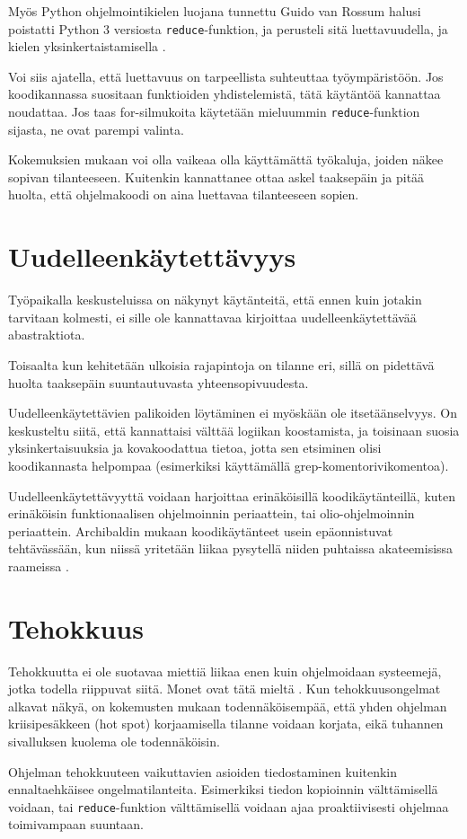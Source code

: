 Myös Python ohjelmointikielen luojana tunnettu Guido van Rossum halusi poistatti Python 3 versiosta \texttt{reduce}-funktion, ja perusteli sitä luettavuudella, ja kielen yksinkertaistamisella \cite{vanrossum2008reduce}.

Voi siis ajatella, että luettavuus on tarpeellista suhteuttaa työympäristöön. Jos koodikannassa suositaan funktioiden yhdistelemistä, tätä käytäntöä kannattaa noudattaa. Jos taas for-silmukoita käytetään mieluummin \texttt{reduce}-funktion sijasta, ne ovat parempi valinta.

Kokemuksien mukaan voi olla vaikeaa olla käyttämättä työkaluja, joiden näkee sopivan tilanteeseen. Kuitenkin kannattanee ottaa askel taaksepäin ja pitää huolta, että ohjelmakoodi on aina luettavaa tilanteeseen sopien.

\section{Uudelleenkäytettävyys}

Työpaikalla keskusteluissa on näkynyt käytänteitä, että ennen kuin jotakin tarvitaan kolmesti, ei sille ole kannattavaa kirjoittaa uudelleenkäytettävää abastraktiota.

Toisaalta kun kehitetään ulkoisia rajapintoja on tilanne eri, sillä on pidettävä huolta taaksepäin suuntautuvasta yhteensopivuudesta.

Uudelleenkäytettävien palikoiden löytäminen ei myöskään ole itsetäänselvyys. On keskusteltu siitä, että kannattaisi välttää logiikan koostamista, ja toisinaan suosia yksinkertaisuuksia ja kovakoodattua tietoa, jotta sen etsiminen olisi koodikannasta helpompaa (esimerkiksi käyttämällä grep-komentorivikomentoa).

Uudelleenkäytettävyyttä voidaan harjoittaa erinäköisillä koodikäytänteillä, kuten erinäköisin funktionaalisen ohjelmoinnin periaattein, tai olio-ohjelmoinnin periaattein. Archibaldin mukaan koodikäytänteet usein epäonnistuvat tehtävässään, kun niissä yritetään liikaa pysytellä niiden puhtaissa akateemisissa raameissa \cite{pennane_fp_gist}.

\section{Tehokkuus}
Tehokkuutta ei ole suotavaa miettiä liikaa enen kuin ohjelmoidaan systeemejä, jotka todella riippuvat siitä. Monet ovat tätä mieltä \cite{pennane_fp_gist,prematureoptimization}. Kun tehokkuusongelmat alkavat näkyä, on kokemusten mukaan todennäköisempää, että yhden ohjelman kriisipesäkkeen (hot spot) korjaamisella tilanne voidaan korjata, eikä tuhannen sivalluksen kuolema ole todennäköisin.

Ohjelman tehokkuuteen vaikuttavien asioiden tiedostaminen kuitenkin ennaltaehkäisee ongelmatilanteita. Esimerkiksi tiedon kopioinnin välttämisellä voidaan, tai \texttt{reduce}-funktion välttämisellä voidaan ajaa proaktiivisesti ohjelmaa toimivampaan suuntaan.

